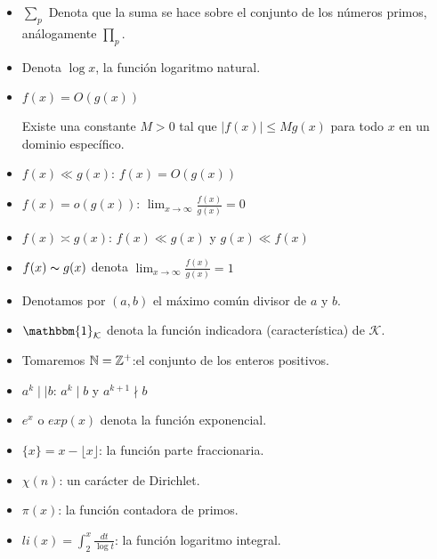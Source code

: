 \begin{itemize}[label=$\bullet$]

\item $\displaystyle\sum_p$ Denota que la suma se hace sobre el conjunto de los números primos, análogamente $\displaystyle\prod_p$.

\item Denota $\log x$, la función logaritmo natural.

\item $f(x)=O\left(g(x)\right)$

Existe una constante $M>0$ tal que $|f(x)|\leq Mg(x)$ para todo $x$ en un dominio específico.

\item $f(x)\ll g(x)$: \quad $f(x)=O(g(x))$

\item $f(x)=o(g(x))$: \quad $\displaystyle\lim_{x \to \infty}\frac{f(x)}{g(x)}=0$

\item $f(x)\asymp g(x)$: \quad $f(x)\ll g(x)$ y $g(x)\ll f(x)$

\item $f(x)\thicksim g(x)$ denota $\displaystyle \lim_{x \to \infty} \frac{f(x)}{g(x)}=1$

\item Denotamos por $(a,b)$ el máximo común divisor de $a$ y $b$.

\item $\mathbbm{1}_{\mathcal{K}}$ denota la función indicadora (característica) de $\mathcal{K}$.

\item Tomaremos $\mathbb{N}=\mathbb{Z}^{+}$:\quad el conjunto de los enteros positivos.

\item $a^k\mid\mid b$: \quad $a^k\mid b$ y $a^{k+1}\nmid b$

\item $e^{x}$ o $exp(x)$ denota la función exponencial.

\item $\{x\}=x-\lfloor x\rfloor$: la función parte fraccionaria.

\item $\chi(n)$: un carácter de Dirichlet.

\item $\pi(x)$: la función contadora  de primos.

\item $li(x)=\displaystyle\int_2^x\frac{dt}{\log t}$: la función logaritmo integral.


\end{itemize}
